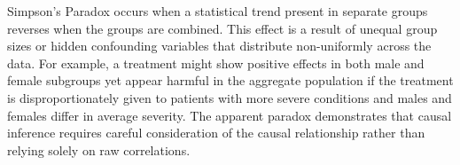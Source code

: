Simpson's Paradox occurs when a statistical trend present in separate groups reverses when the groups are combined. This effect is a result of unequal group sizes or hidden confounding variables that distribute non-uniformly across the data. For example, a treatment might show positive effects in both male and female subgroups yet appear harmful in the aggregate population if the treatment is disproportionately given to patients with more severe conditions and males and females differ in average severity. The apparent paradox demonstrates that causal inference requires careful consideration of the causal relationship rather than relying solely on raw correlations.
